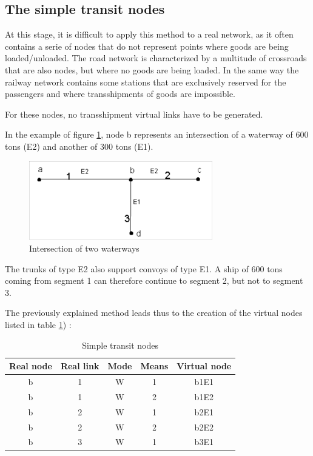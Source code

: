 \subsection{The simple transit nodes}

At this stage, it is difficult to apply this method to a real network, as it often contains a serie of nodes that do not represent points where goods
are being loaded/unloaded.  The road network is characterized by a multitude of
crossroads that are also nodes, but where no goods are being loaded.  In the
same way the railway network contains some stations that are
exclusively reserved for the passengers and where transshipments of goods are
impossible.

For these nodes, no transshipment virtual links have to be
generated.

In the example of figure \ref{f3_8}, node b represents an intersection of a
waterway of 600 tons (E2) and another of 300 tons (E1).

\begin{figure}[htbp]
\centerline{\includegraphics[width=8cm]{f3_8.png}}
\caption{\label{f3_8} Intersection of two waterways}
\end{figure}

The trunks of type E2 also support convoys of type E1.  A ship of 600 tons coming
from segment 1 can therefore continue to segment 2, but not to segment 3.

The previously explained method leads thus to the creation of the virtual nodes listed in table \ref{tab3_6}) :


\begin{table}
\begin{center}
\begin{tabular}{ccccc}
\hline
Real node & Real link & Mode & Means & Virtual node\\
\hline
b & 1 & W & 1 & b1E1\\

b & 1 & W & 2 & b1E2\\

b & 2 & W & 1 & b2E1\\

b & 2 & W & 2 & b2E2\\

b & 3 & W & 1 & b3E1\\
\hline
\end{tabular}
\caption{\label{tab3_6} Simple transit nodes}
\end{center}
\end{table}



